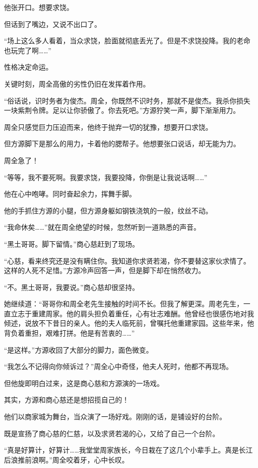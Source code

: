 \begin{this_body}
他张开口。想要求饶。

但话到了嘴边，又说不出口了。

“场上这么多人看着，当众求饶，脸面就彻底丢光了。但是不求饶投降。我的老命也玩完了啊……”

性格决定命运。

关键时刻，周全高傲的劣性仍旧在发挥着作用。

“俗话说，识时务者为俊杰。周全，你既然不识时务，那就不是俊杰。我杀你损失一块紫荆令牌。足以让你骄傲了。你去死吧。”方源狞笑一声，脚下渐渐用力。

周全只感觉巨力压迫而来，他终于抛弃一切的犹豫，想要开口求饶。

但方源脚下是那么的用力，卡着他的腮帮子。他想要张口说话，却无能为力。

周全急了！

“等等，我不要死啊。我要求饶，我要投降，你倒是让我说话啊……”

他在心中咆哮。同时奋起余力，挥舞手脚。

他的手抓住方源的小腿，但方源身躯如钢铁浇筑的一般，纹丝不动。

“我命休矣……”就在周全绝望的时候，忽然听到一道熟悉的声音。

“黑土哥哥。脚下留情。”商心慈赶到了现场。

“心慈，看来终究还是没有瞒住你。我知道你求贤若渴，你不要替这家伙求情了。这样的人死不足惜。”方源冷声回答一声，但是脚下却在悄然收力。

“不。黑土哥哥，我要说。”商心慈却很坚持。

她继续道：“哥哥你和周全老先生接触的时间不长。但我了解更深。周老先生，一直立志于重建周家。他的肩头担负着重任，心有壮志难酬。他曾经也很感伤地对我倾述，说放不下昔日的亲人。他的夫人临死前，曾嘱托他重建家园。这些年来，他背负着重担，艰难打拼。他是有苦衷的……”

“是这样。”方源收回了大部分的脚力，面色微变。

“我怎么不记得向你倾诉过？”周全心中奇怪，他夫人死时，他都不再现场。

但他旋即明白过来，这是商心慈和方源演的一场戏。

其实，方源和商心慈还是想招揽自己的！

他们以商家城为舞台，当众演了一场好戏。刚刚的话，是铺设好的台阶。

既是宣扬了商心慈的仁慈，以及求贤若渴的心，又给了自己一个台阶。

“真是好算计，好算计……我堂堂周家族长，今日栽在了这几个小辈手上。真是长江后浪推前浪啊。”周全咬着牙，心中长叹。


\end{this_body}
